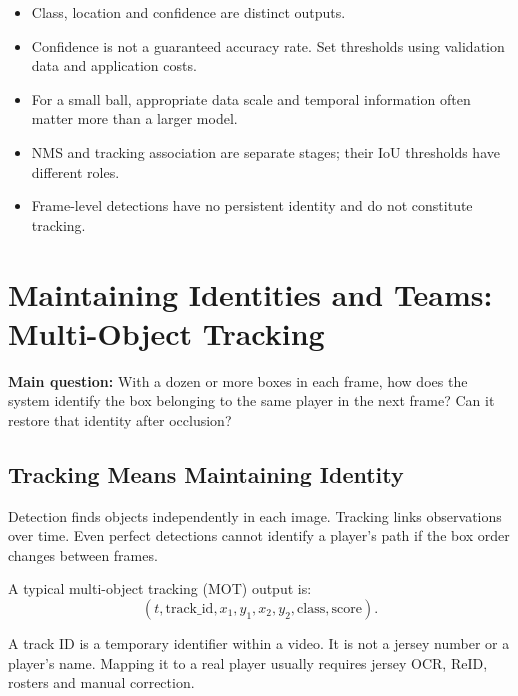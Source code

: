 \documentclass[11pt,a4paper,oneside]{report}
\begin{document}
\begin{takeawayBox}
\begin{itemize}
  \item Class, location and confidence are distinct outputs.
  \item Confidence is not a guaranteed accuracy rate. Set thresholds using validation data and application costs.
  \item For a small ball, appropriate data scale and temporal information often matter more than a larger model.
  \item NMS and tracking association are separate stages; their IoU thresholds have different roles.
  \item Frame-level detections have no persistent identity and do not constitute tracking.
\end{itemize}
\end{takeawayBox}

\chapter{Maintaining Identities and Teams: Multi-Object Tracking}

\begin{heroBox}
\textbf{Main question:}\quad
With a dozen or more boxes in each frame, how does the system identify the box belonging to the same player in the next frame? Can it restore that identity after occlusion?
\end{heroBox}

\section{Tracking Means Maintaining Identity}

\begin{conceptBox}
Detection finds objects independently in each image. Tracking links observations over time. Even perfect detections cannot identify a player's path if the box order changes between frames.
\end{conceptBox}

A typical multi-object tracking (MOT) output is:
\[
(t,\mathrm{track\_id},x_1,y_1,x_2,y_2,\mathrm{class},\mathrm{score}).
\]

A track ID is a temporary identifier within a video. It is not a jersey number or a player's name. Mapping it to a real player usually requires jersey OCR, ReID, rosters and manual correction.
\end{document}
